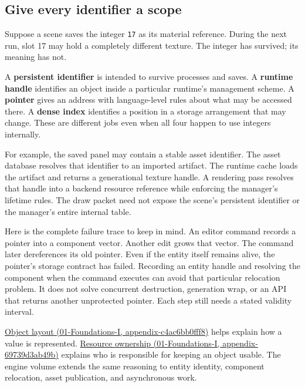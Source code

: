 \subsection{Give every identifier a scope}\label{05-engine-i-ch001-give-every-identifier-a-scope}

Suppose a scene saves the integer \texttt{17} as its material reference. During the next run, slot 17 may hold a completely different texture. The integer has survived; its meaning has not.

A \textbf{persistent identifier} is intended to survive processes and saves. A \textbf{runtime handle} identifies an object inside a particular runtime's management scheme. A \textbf{pointer} gives an address with language-level rules about what may be accessed there. A \textbf{dense index} identifies a position in a storage arrangement that may change. These are different jobs even when all four happen to use integers internally.

For example, the saved panel may contain a stable asset identifier. The asset database resolves that identifier to an imported artifact. The runtime cache loads the artifact and returns a generational texture handle. A rendering pass resolves that handle into a backend resource reference while enforcing the manager's lifetime rules. The draw packet need not expose the scene's persistent identifier or the manager's entire internal table.

Here is the complete failure trace to keep in mind. An editor command records a pointer into a component vector. Another edit grows that vector. The command later dereferences its old pointer. Even if the entity itself remains alive, the pointer's storage contract has failed. Recording an entity handle and resolving the component when the command executes can avoid that particular relocation problem. It does not solve concurrent destruction, generation wrap, or an API that returns another unprotected pointer. Each step still needs a stated validity interval.

\href{../01-Foundations-I/main.pdf\#nameddest=appendix-c4ac6bb0fff8}{Object layout (01-Foundations-I, appendix-c4ac6bb0fff8)} helps explain how a value is represented. \href{../01-Foundations-I/main.pdf\#nameddest=appendix-69739d3ab49b}{Resource ownership (01-Foundations-I, appendix-69739d3ab49b)} explains who is responsible for keeping an object usable. The engine volume extends the same reasoning to entity identity, component relocation, asset publication, and asynchronous work.

